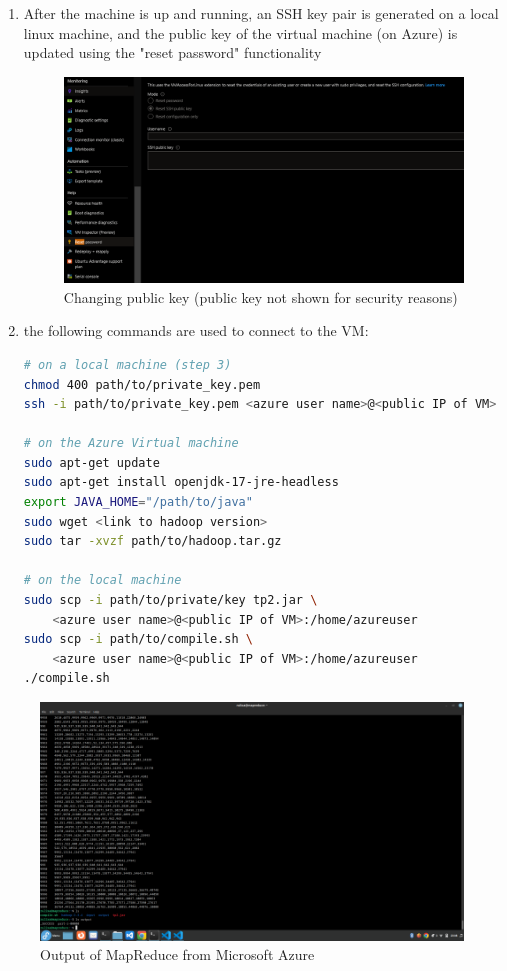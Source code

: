\documentclass[11pt]{article}
\begin{document}
\begin{justifying}
\begin{enumerate}
    \item After the machine is up and running, an SSH key pair is generated on a local linux machine, and the public key of the virtual machine (on Azure) is updated using the "reset password" functionality
\begin{figure}[H]
    \centering
    \includegraphics[width=\linewidth]{Azure-reset-ssh.PNG}
    \caption{Changing public key (public key not shown for security reasons)}
    \label{fig:mrazure}
\end{figure}
    \item the following commands are used to connect to the VM:
    \begin{lstlisting}[language=Bash]
# on a local machine (step 3)
chmod 400 path/to/private_key.pem
ssh -i path/to/private_key.pem <azure user name>@<public IP of VM>

# on the Azure Virtual machine
sudo apt-get update
sudo apt-get install openjdk-17-jre-headless
export JAVA_HOME="/path/to/java"
sudo wget <link to hadoop version>
sudo tar -xvzf path/to/hadoop.tar.gz

# on the local machine
sudo scp -i path/to/private/key tp2.jar \
    <azure user name>@<public IP of VM>:/home/azureuser
sudo scp -i path/to/compile.sh \
    <azure user name>@<public IP of VM>:/home/azureuser
./compile.sh
\end{lstlisting}
\end{enumerate}

\begin{figure}[H]
    \includegraphics[width=\linewidth]{azure.png}
    \caption{Output of MapReduce from Microsoft Azure}
    \label{fig:mrazure}
\end{figure}

\end{justifying}
\end{document}

